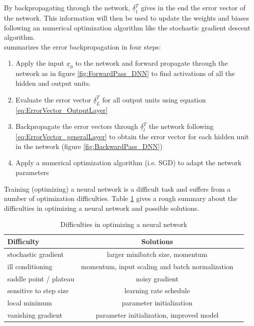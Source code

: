 \documentclass[12pt,DIV14,BCOR12mm,a4paper,footexclude,headinclude,halfparskip-,twoside,openright,cleardoubleempty,idxtotoc,bibtotoc,listtotoc,abstracton]{scrreprt} %
\numberwithin{equation}{chapter}
\begin{document}
By backpropagating through the network, $\underline{\delta}_{1}^{T}$ gives in the end the error vector of the network. This information will then be used to update the weights and biases following an numerical optimization algorithm like the stochastic gradient descent algorithm.\\
\cite{Bishop} summarizes the error backpropagation in four steps:
\begin{enumerate}
	\item Apply the input $\underline{x}_{0}$ to the network and forward propagate through the network as in figure \ref{fig:ForwardPass_DNN} to find activations of all the hidden and output units.
	\item Evaluate the error vector $\underline{\delta}_{L}^{T}$ for all output units using equation \ref{eq:ErrorVector_OutputLayer}
	\item Backpropagate the error vectors through $\underline{\delta}_{l}^{T}$ the network following \ref{eq:ErrorVector_generalLayer} to obtain the error vector for each hidden unit in the network (figure \ref{fig:BackwardPass_DNN})
	\item Apply a numerical optimization algorithm (i.e. SGD) to adapt the network parameters
\end{enumerate}
Training (optimizing) a neural network is a difficult task and suffers from a number of optimization difficulties. Table \ref{tab:Difficulties} gives a rough summary about the difficulties in optimizing a neural network and possible solutions\cite{LectureNotes_DeepLearning}.\\
\begin{table}
    \centering
    \caption{Difficulties in optimizing a neural network}
    \label{tab:Difficulties}
    \begin{tabular}{lcc}
        \toprule
        Difficulty & Solutions\\
        \midrule
        stochastic gradient & larger minibatch size, momentum\\
        ill conditioning & momentum, input scaling and batch normalization\\
        saddle point / plateau & noisy gradient\\
        sensitive to step size & learning rate schedule\\
        local minimum & parameter initialization\\
        vanishing gradient & parameter initialization, improved model\\
        \bottomrule
    \end{tabular}
\end{table}
\end{document}
